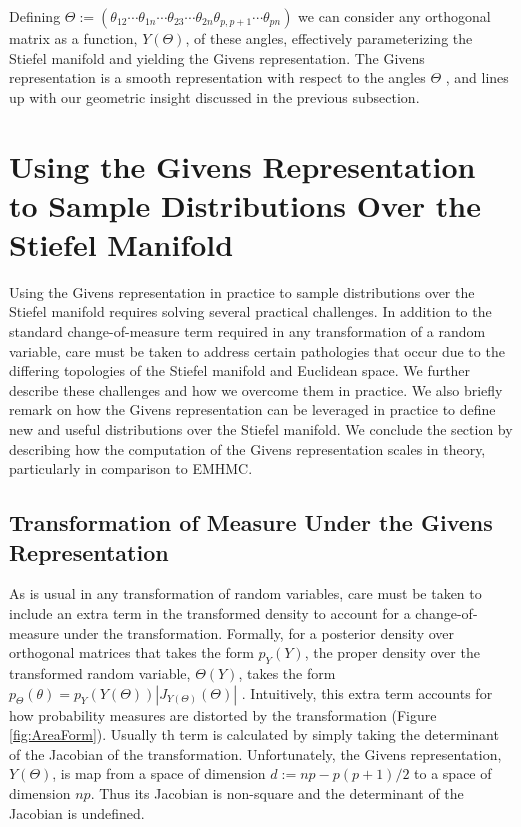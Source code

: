 \documentclass[ba]{imsart}
\numberwithin{equation}{section}
\theoremstyle{plain}
\begin{document}
\noindent Defining $\Theta := (\theta_{12} \cdots \theta_{1n} \cdots \theta_{23} \cdots \theta_{2n} \theta_{p,p+1} \cdots \theta_{pn})$ we can consider any orthogonal matrix as a function, $Y(\Theta)$, of these angles, effectively parameterizing the Stiefel manifold and yielding the Givens representation. The Givens representation is a smooth representation with respect to the angles $\Theta$ \citep{shepard2015representation},  and lines up with our geometric insight discussed in the previous subsection.


\section{Using the Givens Representation to Sample Distributions Over the Stiefel Manifold} \label{implementation}
Using the Givens representation in practice to sample distributions over the Stiefel manifold requires solving several practical challenges. In addition to the standard change-of-measure term required in any transformation of a random variable, care must be taken to address certain pathologies that occur due to the differing topologies of the Stiefel manifold and Euclidean space. We further describe these challenges and how we overcome them in practice. We also briefly remark on how the Givens representation can be leveraged in practice to define new and useful distributions over the Stiefel manifold. We conclude the section by describing how the computation of the Givens representation scales in theory, particularly in comparison to EMHMC.

\subsection{Transformation of Measure Under the Givens Representation}\label{measureGivens}
As is usual in any transformation of random variables, care must be taken to include an extra term in the transformed density to account for a change-of-measure under the transformation. Formally, for a posterior density over orthogonal matrices that takes the form $p_Y(Y)$, the proper density over the transformed random variable, $\Theta(Y)$, takes the form $p_\Theta(\theta) = p_{Y}(Y(\Theta)) |J_{Y(\Theta)}(\Theta)|$ \citep{keener2011theoretical}. Intuitively, this extra term accounts for how probability measures are distorted by the transformation (Figure \ref{fig:AreaForm}). Usually th term is calculated by simply taking the determinant of the Jacobian of the transformation. Unfortunately, the Givens representation, $Y(\Theta)$, is map from a space of dimension $d := np - p(p+1)/2$ to a space of dimension $np$. Thus its Jacobian is non-square and the determinant of the Jacobian is undefined.
\end{document}
